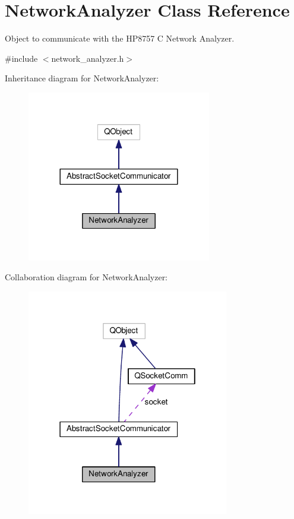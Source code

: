 \hypertarget{class_network_analyzer}{}\section{Network\+Analyzer Class Reference}
\label{class_network_analyzer}


Object to communicate with the H\+P8757 C Network Analyzer.  




{\ttfamily \#include $<$network\+\_\+analyzer.\+h$>$}



Inheritance diagram for Network\+Analyzer\+:\nopagebreak
\begin{figure}[H]
\begin{center}
\leavevmode
\includegraphics[width=228pt]{class_network_analyzer__inherit__graph}
\end{center}
\end{figure}


Collaboration diagram for Network\+Analyzer\+:\nopagebreak
\begin{figure}[H]
\begin{center}
\leavevmode
\includegraphics[width=250pt]{class_network_analyzer__coll__graph}
\end{center}
\end{figure}
